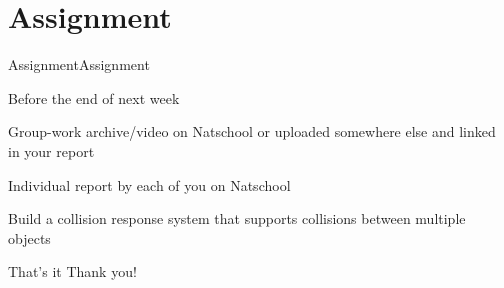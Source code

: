 \documentclass{beamer}
\begin{document}
\section{Assignment}
\begin{slide}{Assignment}{Assignment}{
\item Before the end of next week
\item Group-work archive/video on Natschool or uploaded somewhere else and linked in your report
\item Individual report by each of you on Natschool
\item Build a collision response system that supports collisions between multiple objects
}\end{slide}

\begin{frame}{That's it}
\center
\fontsize{18pt}{7.2}\selectfont
Thank you!
\end{frame}
\end{document}
